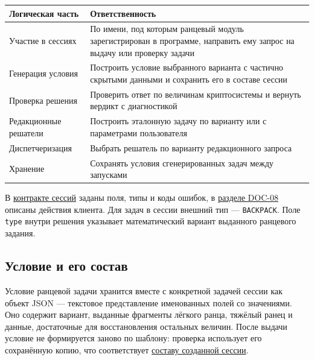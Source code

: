 \documentclass[12pt,a4paper]{article}
\begin{document}
{\def\LTcaptype{none} %
\begin{longtable}[]{@{}
  >{\raggedright\arraybackslash}p{}
  >{\raggedright\arraybackslash}p{}@{}}
\toprule\noalign{}
\begin{minipage}[b]{\linewidth}\raggedright
Логическая часть
\end{minipage} & \begin{minipage}[b]{\linewidth}\raggedright
Ответственность
\end{minipage} \\
\midrule\noalign{}
\endhead
\bottomrule\noalign{}
\endlastfoot
Участие в сессиях & По имени, под которым ранцевый модуль зарегистрирован в программе, направить ему запрос на выдачу или проверку задачи \\
Генерация условия & Построить условие выбранного варианта с частично скрытыми данными и сохранить его в составе сессии \\
Проверка решения & Проверить ответ по величинам криптосистемы и вернуть вердикт с диагностикой \\
Редакционные решатели & Построить эталонную задачу по варианту или с параметрами пользователя \\
Диспетчеризация & Выбрать решатель по варианту редакционного запроса \\
Хранение & Сохранять условия сгенерированных задач между запусками \\
\end{longtable}
}

В {\href{DOC-06.2\_Сессии\_задач\_и\_планировщик.pdf\#doc-062-контракты-сессий-задач}{контракте сессий}} заданы поля, типы и коды ошибок, в {\href{../09\_Архитектура\_и\_API/DOC-08\_Справочник\_API.pdf\#doc-08-справочник-api-сессии-задач}{разделе DOC-08}} описаны действия клиента. Для задач в сессии внешний тип --- \texttt{BACKPACK}. Поле \texttt{type} внутри решения указывает математический вариант выданного ранцевого задания.

\subsection{Условие и его состав}\label{ux443ux441ux43bux43eux432ux438ux435-ux438-ux435ux433ux43e-ux441ux43eux441ux442ux430ux432}

\hypertarget{условие-и-его-состав}{}

Условие ранцевой задачи хранится вместе с конкретной задачей сессии как объект JSON --- текстовое представление именованных полей со значениями. Оно содержит вариант, выданные фрагменты лёгкого ранца, тяжёлый ранец и данные, достаточные для восстановления остальных величин. После выдачи условие не формируется заново по шаблону: проверка использует его сохранённую копию, что соответствует {\href{DOC-06\_Программные\_требования.pdf\#swr-sys-003-состав-созданной-сессии}{составу созданной сессии}}.
\end{document}
